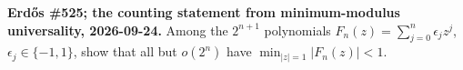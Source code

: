 \textbf{Erd\H{o}s \#525; the counting statement from minimum-modulus universality, 2026-09-24.}
Among the $2^{n+1}$ polynomials $F_n(z)=\sum_{j=0}^n\epsilon_jz^j$, $\epsilon_j\in\{-1,1\}$, show that all but $o(2^n)$ have $\min_{|z|=1}|F_n(z)|<1$.
